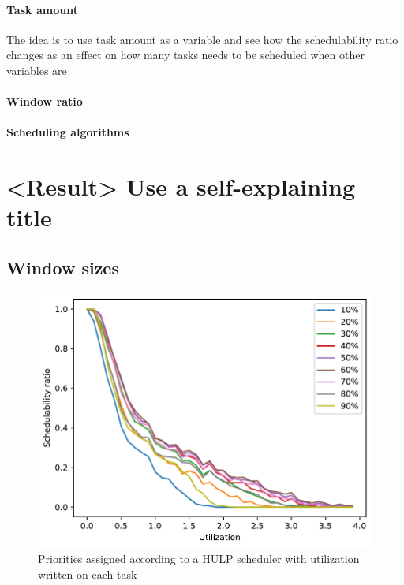 \documentclass{kththesis}
\begin{document}
\subsubsection{Task amount}

The idea is to use task amount as a variable and see how the schedulability ratio changes as an
effect on how many tasks needs to be scheduled when other variables are 

\subsubsection{Window ratio}

\subsubsection{Scheduling algorithms}




\chapter{<Result> Use a self-explaining title}

\section{Window sizes}

\begin{figure}

    \centering

    \includegraphics[width=1.0\linewidth]{images/window_ratio.pdf}

    \caption{Priorities assigned according to a HULP scheduler with utilization written on each task}

    \label{fig:window_ratio}

\end{figure}
\end{document}
